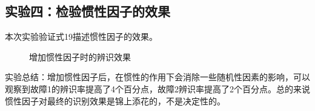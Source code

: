 \documentclass[lang=cn,11pt,a4paper]{elegantpaper}
\begin{document}
\subsection{实验四：检验惯性因子的效果}
本次实验验证式19描述惯性因子的效果。
\begin{figure}[H]
	\centering  %
	\caption{增加惯性因子时的辨识效果}
	\label{Fig.main}
\end{figure}
实验总结：增加惯性因子后，在惯性的作用下会消除一些随机性因素的影响，可以观察到故障1的辨识率提高了4个百分点，故障2辨识率提高了2个百分点。总的来说惯性因子对最终的识别效果是锦上添花的，不是决定性的。
\end{document}
